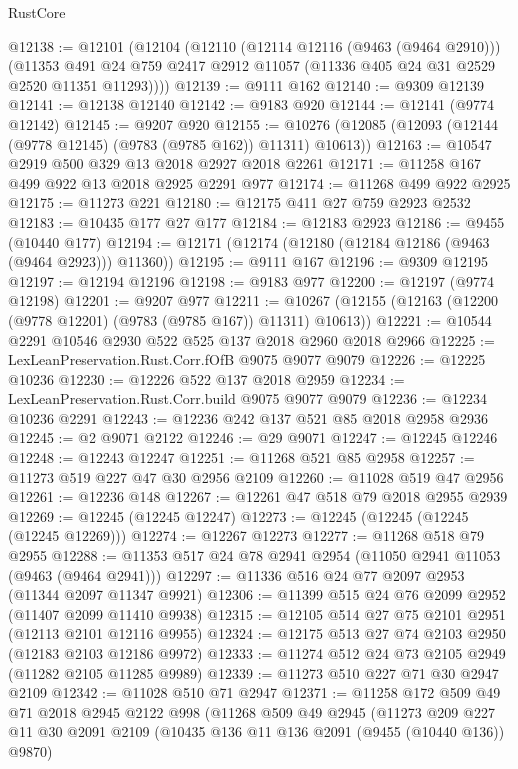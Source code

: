 \begin{lexlean}{RustCore}
\begin{coremodule}
@12138 := @12101
    (@12104
      (@12110
        (@12114 @12116 (@9463 (@9464 @2910)))
        (@11353 @491 @24 @759 @2417 @2912 @11057 (@11336 @405 @24 @31 @2529 @2520 @11351 @11293))))
@12139 := @9111 @162
@12140 := @9309 @12139
@12141 := @12138 @12140
@12142 := @9183 @920
@12144 := @12141 (@9774 @12142)
@12145 := @9207 @920
@12155 := @10276 (@12085 (@12093 (@12144 (@9778 @12145) (@9783 (@9785 @162)) @11311) @10613))
@12163 := @10547 @2919 @500 @329 @13 @2018 @2927 @2018 @2261
@12171 := @11258 @167 @499 @922 @13 @2018 @2925 @2291 @977
@12174 := @11268 @499 @922 @2925
@12175 := @11273 @221
@12180 := @12175 @411 @27 @759 @2923 @2532
@12183 := @10435 @177 @27 @177
@12184 := @12183 @2923
@12186 := @9455 (@10440 @177)
@12194 := @12171 (@12174 (@12180 (@12184 @12186 (@9463 (@9464 @2923))) @11360))
@12195 := @9111 @167
@12196 := @9309 @12195
@12197 := @12194 @12196
@12198 := @9183 @977
@12200 := @12197 (@9774 @12198)
@12201 := @9207 @977
@12211 := @10267 (@12155 (@12163 (@12200 (@9778 @12201) (@9783 (@9785 @167)) @11311) @10613))
@12221 := @10544 @2291 @10546 @2930 @522 @525 @137 @2018 @2960 @2018 @2966
@12225 := LexLeanPreservation.Rust.Corr.fOfB @9075 @9077 @9079
@12226 := @12225 @10236
@12230 := @12226 @522 @137 @2018 @2959
@12234 := LexLeanPreservation.Rust.Corr.build @9075 @9077 @9079
@12236 := @12234 @10236 @2291
@12243 := @12236 @242 @137 @521 @85 @2018 @2958 @2936
@12245 := @2 @9071 @2122
@12246 := @29 @9071
@12247 := @12245 @12246
@12248 := @12243 @12247
@12251 := @11268 @521 @85 @2958
@12257 := @11273 @519 @227 @47 @30 @2956 @2109
@12260 := @11028 @519 @47 @2956
@12261 := @12236 @148
@12267 := @12261 @47 @518 @79 @2018 @2955 @2939
@12269 := @12245 (@12245 @12247)
@12273 := @12245 (@12245 (@12245 (@12245 @12269)))
@12274 := @12267 @12273
@12277 := @11268 @518 @79 @2955
@12288 := @11353 @517 @24 @78 @2941 @2954 (@11050 @2941 @11053 (@9463 (@9464 @2941)))
@12297 := @11336 @516 @24 @77 @2097 @2953 (@11344 @2097 @11347 @9921)
@12306 := @11399 @515 @24 @76 @2099 @2952 (@11407 @2099 @11410 @9938)
@12315 := @12105 @514 @27 @75 @2101 @2951 (@12113 @2101 @12116 @9955)
@12324 := @12175 @513 @27 @74 @2103 @2950 (@12183 @2103 @12186 @9972)
@12333 := @11274 @512 @24 @73 @2105 @2949 (@11282 @2105 @11285 @9989)
@12339 := @11273 @510 @227 @71 @30 @2947 @2109
@12342 := @11028 @510 @71 @2947
@12371 := @11258
    @172
    @509
    @49
    @71
    @2018
    @2945
    @2122
    @998
    (@11268
      @509
      @49
      @2945
      (@11273
        @209
        @227
        @11
        @30
        @2091
        @2109
        (@10435 @136 @11 @136 @2091 (@9455 (@10440 @136)) @9870)

\end{coremodule}
\end{lexlean}

